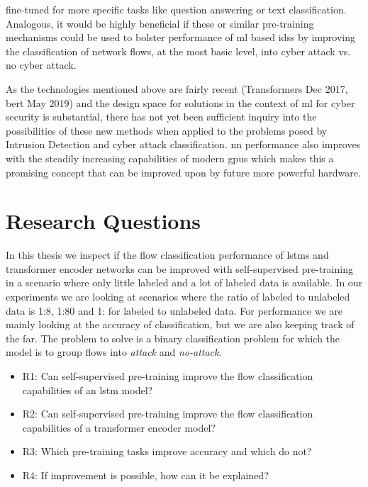 fine-tuned for more specific tasks like question answering or text classification. Analogous, it would be highly beneficial if these or similar pre-training mechanisms could be used to bolster performance of \gls{ml} based \glspl{ids} by improving the classification of network flows, at the most basic level, into cyber attack vs. no cyber attack. \par
As the technologies mentioned above are fairly recent (Transformers Dec 2017, \gls{bert} May 2019) and the design space for solutions in the context of \gls{ml} for cyber security is substantial, there has not yet been sufficient inquiry into the possibilities of these new methods when applied to the problems posed by Intrusion Detection and cyber attack classification. \gls{nn} performance also improves with the steadily increasing capabilities of modern \glspl{gpu} which makes this a promising concept that can be improved upon by future more powerful hardware. 


\section{Research Questions} \label{sect.research_questions}

In this thesis we inspect if the flow classification performance of \glspl{lstm} and transformer encoder networks can be improved with self-supervised pre-training in a scenario where only little labeled and a lot of labeled data is available. In our experiments we are looking at scenarios where the ratio of labeled to unlabeled data is 1:8, 1:80 and 1: for labeled to unlabeled data. For performance we are mainly looking at the accuracy of classification, but we are also keeping track of the \gls{far}. The problem to solve is a binary classification problem for which the model is to group flows into \textit{attack} and \textit{no-attack}. 

\begin{itemize}
	\item R1: Can self-supervised pre-training improve the flow classification capabilities of an \gls{lstm} model?
	\item R2: Can self-supervised pre-training improve the flow classification capabilities of a transformer encoder model?
	\item R3: Which pre-training tasks improve accuracy and which do not?
	\item R4: If improvement is possible, how can it be explained?
\end{itemize}


